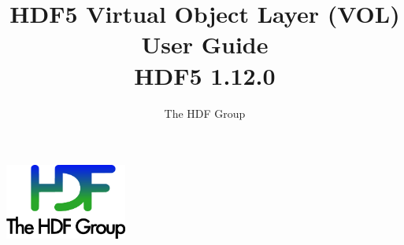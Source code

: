 \documentclass[10pt,a4paper]{article}
\begin{document}
\title{HDF5 Virtual Object Layer (VOL) User Guide\\
    \large HDF5 1.12.0}

\author{The HDF Group}

\maketitle
\thispagestyle{empty}

\vfill
\begin{center}
\includegraphics[width=4cm]{THG_LOGO.pdf} %
\end{center}
\vfill
\vfill


\newpage
{}
\tableofcontents
\newpage





\end{document}
